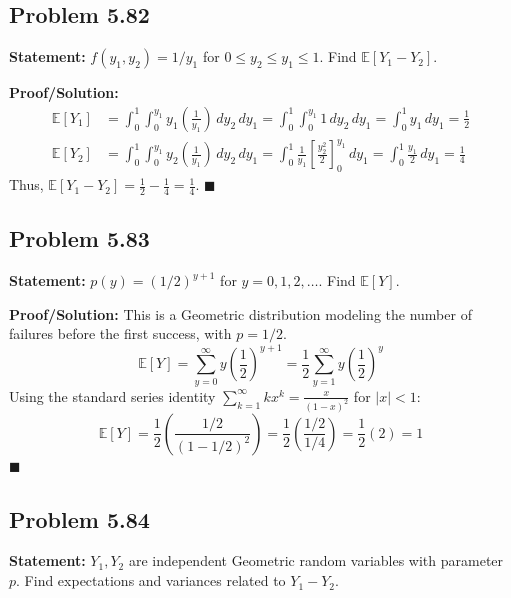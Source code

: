 \documentclass[11pt, a4paper]{article}
\theoremstyle{definition}
\theoremstyle{remark}
\newcommand{\E}{\mathbb{E}}
\begin{document}
\subsection{Problem 5.82}
\textbf{Statement:} $f(y_1, y_2) = 1/y_1$ for $0 \leq y_2 \leq y_1 \leq 1$. Find $\E[Y_1 - Y_2]$.

\textbf{Proof/Solution:}
\begin{align*}
    \E[Y_1] &= \int_0^1 \int_0^{y_1} y_1 \left(\frac{1}{y_1}\right) \, dy_2 \, dy_1 = \int_0^1 \int_0^{y_1} 1 \, dy_2 \, dy_1 = \int_0^1 y_1 \, dy_1 = \frac{1}{2} \\
    \E[Y_2] &= \int_0^1 \int_0^{y_1} y_2 \left(\frac{1}{y_1}\right) \, dy_2 \, dy_1 = \int_0^1 \frac{1}{y_1} \left[ \frac{y_2^2}{2} \right]_0^{y_1} \, dy_1 = \int_0^1 \frac{y_1}{2} \, dy_1 = \frac{1}{4}
\end{align*}
Thus, $\E[Y_1 - Y_2] = \frac{1}{2} - \frac{1}{4} = \frac{1}{4}$.
\hfill $\blacksquare$

\subsection{Problem 5.83}
\textbf{Statement:} $p(y) = (1/2)^{y+1}$ for $y = 0, 1, 2, \dots$. Find $\E[Y]$.

\textbf{Proof/Solution:}
This is a Geometric distribution modeling the number of failures before the first success, with $p = 1/2$.
\[
\E[Y] = \sum_{y=0}^\infty y \left(\frac{1}{2}\right)^{y+1} = \frac{1}{2} \sum_{y=1}^\infty y \left(\frac{1}{2}\right)^y
\]
Using the standard series identity $\sum_{k=1}^\infty k x^k = \frac{x}{(1-x)^2}$ for $|x| < 1$:
\[
\E[Y] = \frac{1}{2} \left( \frac{1/2}{(1 - 1/2)^2} \right) = \frac{1}{2} \left( \frac{1/2}{1/4} \right) = \frac{1}{2} (2) = 1
\]
\hfill $\blacksquare$

\subsection{Problem 5.84}
\textbf{Statement:} $Y_1, Y_2$ are independent Geometric random variables with parameter $p$. Find expectations and variances related to $Y_1 - Y_2$.
\end{document}
